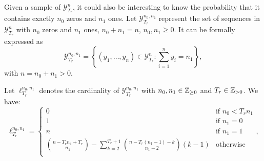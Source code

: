 \documentclass{article}
\begin{document}
  Given a sample of $\mathcal{Y}_{T_r}^{n}$, it could also be interesting to know the probability 
  that it contains exactly $n_0$ zeros and $n_1$ ones. Let $\mathcal{Y}_{T_r}^{n_0, n_1}$ represent
  the set of sequences in $\mathcal{Y}_{T_r}^{n}$ with $n_0$ zeros and $n_1$ ones, $n_0 + n_1 = n$, $n_0, n_1 \geq 0$.
  It can be formally expressed as
  \begin{equation}
    \mathcal{Y}_{T_r}^{n_0, n_1} = \left\{(y_1, \dots, y_{n}) \in \mathcal{Y}_{T_r}^{n} : \sum_{i=1}^n y_i = n_1\right\},
  \end{equation}
  with $n = n_0 + n_1 > 0$.

  \begin{theorem}
    Let $\ell_{T_r}^{n_0,n_1}$ denotes the cardinality of $\mathcal{Y}_{T_r}^{n_0, n_1}$ with $n_0, n_1 \in \mathbb{Z}_{\geq 0}$ and $T_r \in \mathbb{Z}_{> 0}$. We have:
    \begin{equation}
      \ell_{T_r}^{n_0,n_1} = 
      \left\{
        \begin{array}{ll}
          0 & \mbox{if } n_0 < T_r n_1 \\
          1 & \mbox{if } n_1 = 0 \\
          n & \mbox{if } n_1 = 1 \\
          \binom{n - T_r n_1 + T_r}{n_1} - \sum_{k=2}^{T_r+1} \binom{n - T_r(n_1 - 1) - k}{n_1-2}(k-1) & \mbox{otherwise} \\
        \end{array}
      \right.,
    \end{equation}
  \end{theorem}
\end{document}
